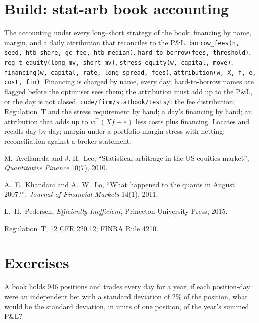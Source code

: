 \section{Build: stat-arb book accounting}\label{bld:s1:anatomy-of-a-stat-arb-book:statbook}

\begin{build}
 The accounting under every long--short strategy of the book: financing by name, margin, and a daily attribution that reconciles to the P\&L.
 \texttt{borrow\_fees(n, seed, htb\_share, gc\_fee, htb\_median)}, \texttt{hard\_to\_borrow(fees, threshold)}, \texttt{reg\_t\_equity(long\_mv,
short\_mv)}, \texttt{stress\_equity(w, capital, move)}, \texttt{financing(w, capital, rate, long\_spread, fees)}, \texttt{attribution(w, X, f, e, cost, fin)}.
 Financing is charged by name, every day; hard-to-borrow names are flagged before the optimiser sees them; the attribution must add up to the
P\&L, or the day is not closed.
 \texttt{code/firm/statbook/tests/}: the fee distribution; Regulation~T and the stress requirement by hand; a day's financing by hand; an
attribution that adds up to $w^\top(Xf + e)$ less costs plus financing.
 Locates and recalls day by day; margin under a portfolio-margin stress with netting; reconciliation against a broker statement.
\end{build}

\begin{omsources}
\item M.~Avellaneda and J.-H.~Lee, ``Statistical arbitrage in the US equities market'', \emph{Quantitative Finance} 10(7), 2010.
\item A.~E.~Khandani and A.~W.~Lo, ``What happened to the quants in August 2007?'', \emph{Journal of Financial Markets} 14(1), 2011.
\item L.~H.~Pedersen, \emph{Efficiently Inefficient}, Princeton University Press, 2015.
\item Regulation~T, 12 CFR 220.12; FINRA Rule 4210.
\end{omsources}

\section{Exercises}

\begin{exercise}[$\star$]\label{exo:s1:anatomy-of-a-stat-arb-book:1}
A book holds 946 positions and trades every day for a year; if each position-day were an independent bet with a standard deviation of 2\% of the position, what
would be the standard deviation, in units of one position, of the year's summed P\&L?
\end{exercise}


